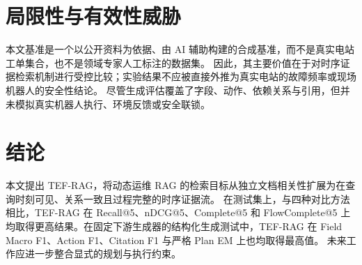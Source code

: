 \begin{table}[t]
\caption{生成测试集上的主要结构化生成指标。}
\label{tab:generation_results}
\centering
\small
\setlength{\tabcolsep}{3pt}
\end{table}

\section{局限性与有效性威胁}
\label{sec:limitations}

本文基准是一个以公开资料为依据、由 AI 辅助构建的合成基准，而不是真实电站工单集合，也不是领域专家人工标注的数据集。
因此，其主要价值在于对时序证据检索机制进行受控比较；实验结果不应被直接外推为真实电站的故障频率或现场机器人的安全性结论。
尽管生成评估覆盖了字段、动作、依赖关系与引用，但并未模拟真实机器人执行、环境反馈或安全联锁。

\section{结论}
\label{sec:conclusion}

本文提出 TEF-RAG，将动态运维 RAG 的检索目标从独立文档相关性扩展为在查询时刻可见、关系一致且过程完整的时序证据流。
在测试集上，与四种对比方法相比，TEF-RAG 在 Recall@5、nDCG@5、Complete@5 和 FlowComplete@5 上均取得更高结果。在固定下游生成器的结构化生成测试中，TEF-RAG 在 Field Macro F1、Action F1、Citation F1 与严格 Plan EM 上也均取得最高值。
未来工作应进一步整合显式的规划与执行约束。
